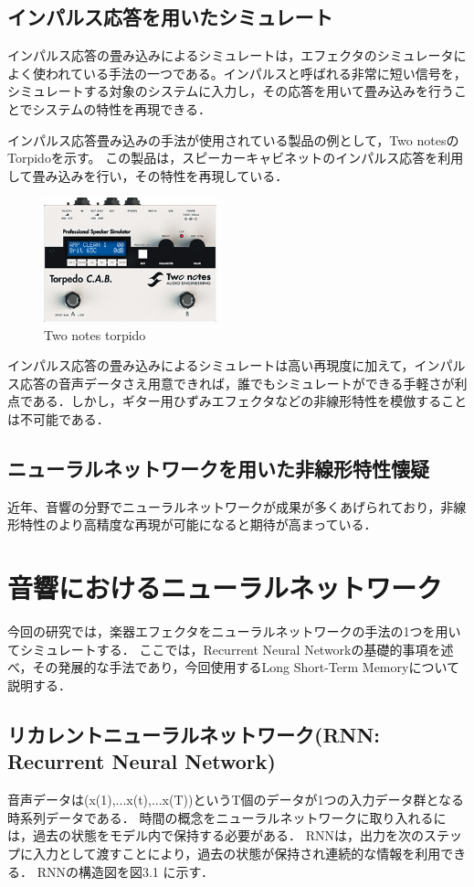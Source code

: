 \documentclass{jreport}		%
\begin{document}
\section{インパルス応答を用いたシミュレート}
インパルス応答の畳み込みによるシミュレートは，エフェクタのシミュレータによく使われている手法の一つである。インパルスと呼ばれる非常に短い信号を，シミュレートする対象のシステムに入力し，その応答を用いて畳み込みを行うことでシステムの特性を再現できる．

インパルス応答畳み込みの手法が使用されている製品の例として，Two notesのTorpidoを示す。
この製品は，スピーカーキャビネットのインパルス応答を利用して畳み込みを行い，その特性を再現している．

\begin{figure}[htbp]
 \begin{center}
  \includegraphics[width=50mm]{torpido.png}
 \end{center}
 \caption{Two notes torpido}
 \label{fig:one}
\end{figure}

インパルス応答の畳み込みによるシミュレートは高い再現度に加えて，インパルス応答の音声データさえ用意できれば，誰でもシミュレートができる手軽さが利点である．しかし，ギター用ひずみエフェクタなどの非線形特性を模倣することは不可能である．

\section{ニューラルネットワークを用いた非線形特性懐疑}
近年、音響の分野でニューラルネットワークが成果が多くあげられており，非線形特性のより高精度な再現が可能になると期待が高まっている．

\chapter{音響におけるニューラルネットワーク}
今回の研究では，楽器エフェクタをニューラルネットワークの手法の1つを用いてシミュレートする．
ここでは，Recurrent Neural Networkの基礎的事項を述べ，その発展的な手法であり，今回使用するLong Short-Term Memoryについて説明する．

\section{リカレントニューラルネットワーク(RNN: Recurrent Neural Network)}
音声データは(x(1),...x(t),...x(T))というT個のデータが1つの入力データ群となる時系列データである．
時間の概念をニューラルネットワークに取り入れるには，過去の状態をモデル内で保持する必要がある．
RNNは，出力を次のステップに入力として渡すことにより，過去の状態が保持され連続的な情報を利用できる．
RNNの構造図を図3.1 に示す．
\end{document}
